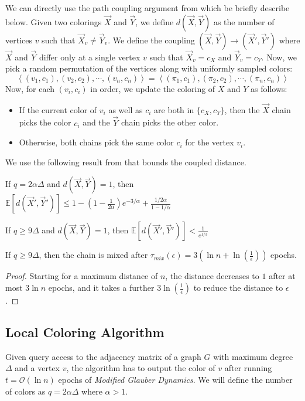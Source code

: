 We can directly use the path coupling argument from \cite{mohsen} which be briefly describe below.
Given two colorings $\vec X$ and $\vec Y$, we define $d(\vec X,\vec Y)$ as the number of vertices $v$ such that $\vec X_v\not= \vec Y_v$.
We define the coupling $(\vec X,\vec Y)\rightarrow(\vec X',\vec Y')$ where $\vec X$ and $\vec Y$
differ only at a single vertex $v$ such that $\vec X_v = c_X$ and $\vec Y_v = c_Y$.
Now, we pick a random permutation of the vertices along with uniformly sampled colors:
\[
\left\langle (v_1, c_1), (v_2, c_2), \cdots, (v_n, c_n)\right\rangle
= \left\langle (\pi_1, c_1), (\pi_2, c_2), \cdots, (\pi_n, c_n)\right\rangle
\]
Now, for each $(v_i, c_i)$ in order, we update the coloring of $X$ and $Y$ as follows:
\begin{itemize}
    \item If the current color of $v_i$ as well as $c_i$ are both in $\{c_X,c_Y\}$,
    then the $\vec X$ chain picks the color $c_i$ and the $\vec Y$ chain picks the other color.
    \item Otherwise, both chains pick the same color $c_i$ for the vertex $v_i$.
\end{itemize}
We use the following result from \cite{mohsen} that bounds the coupled distance.
\begin{lemma}
\label{lem:mohsen_single_epoch_distance}
If $q = 2\alpha\Delta$ and $d(\vec X, \vec Y) = 1$,
then $\mathbb E[d(\vec X',\vec Y')] \le 1-\left( 1-\frac1{2\alpha}\right)e^{-3/\alpha} + \frac{1/2\alpha}{1-1/\alpha}$
\end{lemma}
\begin{corollary}
\label{cor:single_epoch_distansce}
If $q \ge 9\Delta$ and $d(\vec X, \vec Y) = 1$, then $\mathbb E[d(\vec X',\vec Y')] < \frac1{e^{1/3}}$
\end{corollary}

\begin{theorem}
\label{thm:modified_mixing_time}
If $q\ge 9\Delta$, then the chain is mixed after $\tau_{mix}(\epsilon) = 3\left( \ln n + \ln(\frac1{\epsilon})\right)$ epochs.
\end{theorem}
\begin{proof}
Starting for a maximum distance of $n$, the distance decreases to $1$ after at most $3\ln n$ epochs,
and it takes a further $3\ln\left( \frac{1}{\epsilon} \right)$ to reduce the distance to $\epsilon$.
\end{proof}




\subsection{Local Coloring Algorithm}%
\label{sec:local_coloring_algortihm}
Given query access to the adjacency matrix of a graph $G$ with maximum degree $\Delta$ and a vertex $v$,
the algorithm has to output the color of $v$ after running $t = \mathcal O(\ln n)$ epochs of \emph{Modified Glauber Dynamics}.
We will define the number of colors as $q = 2\alpha\Delta$ where $\alpha > 1$.

